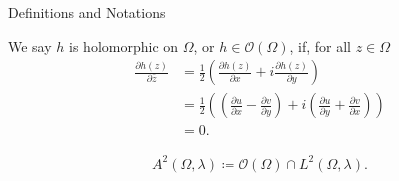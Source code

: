 \documentclass{reu_beamer}
\begin{document}
\begin{frame}{Definitions and Notations}
\begin{definition}
  We say $h$ is holomorphic on $\Omega$, or $h\in \mathcal{O}\left(\Omega\right)$, if, for all $z\in \Omega$
    \begin{align*}
      \frac{\partial h(z)}{\partial \bar{z}}&= \frac{1}{2}\left(\frac{\partial h(z)}{\partial x} + i\frac{\partial h(z)}{\partial y} \right)\\
                                            &= \frac{1}{2}\left(\left(\frac{\partial u}{\partial x} - \frac{\partial v}{\partial y}\right) + i\left(\frac{\partial u}{\partial y} + \frac{\partial v}{\partial x}\right)\right)\\
                                            &= 0.
    \end{align*}
\end{definition} 

\begin{definition}
    \begin{align*}
        A^{2}(\Omega,\lambda) \coloneq \mathcal{O}(\Omega)\cap L^{2}(\Omega,\lambda).
    \end{align*}
\end{definition}
\end{frame}
\end{document}
